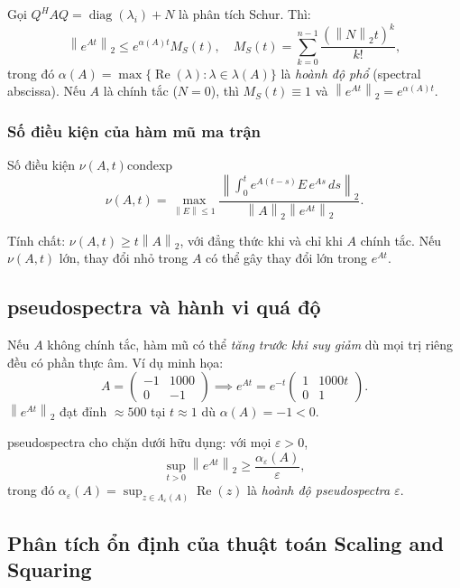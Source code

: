 \documentclass[12pt,a4paper]{report}
\newcommand{\norm}[1]{\left\lVert #1 \right\rVert}
\newcommand{\diag}{\operatorname{diag}}
\DeclareMathOperator{\re}{Re}
\begin{document}
Gọi $Q^H AQ = \diag(\lambda_i) + N$ là phân tích Schur. Thì:
\[
  \norm{e^{At}}_2 \le e^{\alpha(A)t} M_S(t), \quad
  M_S(t) = \sum_{k=0}^{n-1} \frac{(\norm{N}_2 t)^k}{k!},
\]
trong đó $\alpha(A) = \max\{\re(\lambda): \lambda \in \lambda(A)\}$ là \emph{hoành độ phổ}
(spectral abscissa). Nếu $A$ là chính tắc ($N=0$), thì $M_S(t) \equiv 1$ và
$\norm{e^{At}}_2 = e^{\alpha(A)t}$.

\subsubsection{Số điều kiện của hàm mũ ma trận}

\begin{definition}{Số điều kiện $\nu(A,t)$}{condexp}
\[
  \nu(A,t) = \max_{\norm{E} \le 1}
  \frac{\displaystyle\left\|\int_0^t e^{A(t-s)} E\, e^{As}\,ds\right\|_2}
       {\norm{A}_2 \norm{e^{At}}_2}.
\]
\end{definition}

Tính chất: $\nu(A,t) \ge t\norm{A}_2$, với đẳng thức khi và chỉ khi $A$ chính tắc.
Nếu $\nu(A,t)$ lớn, thay đổi nhỏ trong $A$ có thể gây thay đổi lớn trong $e^{At}$.

\subsection{pseudospectra và hành vi quá độ}

Nếu $A$ không chính tắc, hàm mũ có thể \emph{tăng trước khi suy giảm} dù mọi trị riêng
đều có phần thực âm. Ví dụ minh họa:
\[
  A = \begin{pmatrix} -1 & 1000 \\ 0 & -1 \end{pmatrix}
  \implies
  e^{At} = e^{-t}\begin{pmatrix} 1 & 1000t \\ 0 & 1 \end{pmatrix}.
\]
$\norm{e^{At}}_2$ đạt đỉnh $\approx 500$ tại $t \approx 1$ dù $\alpha(A) = -1 < 0$.

pseudospectra cho chặn dưới hữu dụng: với mọi $\varepsilon > 0$,
\[
  \sup_{t > 0} \norm{e^{At}}_2 \ge \frac{\alpha_\varepsilon(A)}{\varepsilon},
\]
trong đó $\alpha_\varepsilon(A) = \sup_{z \in \Lambda_\varepsilon(A)} \re(z)$ là
\emph{hoành độ pseudospectra $\varepsilon$}.

\subsection{Phân tích ổn định của thuật toán Scaling and Squaring}
\end{document}
